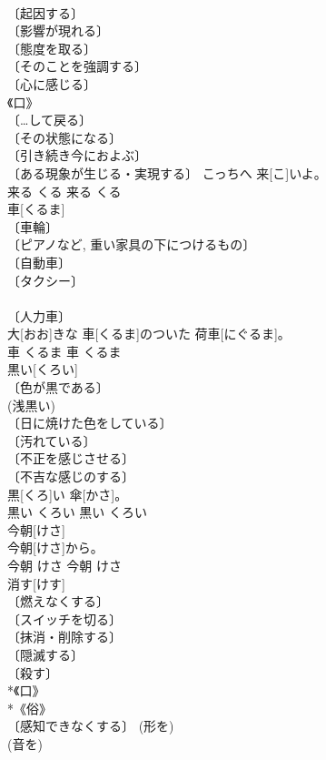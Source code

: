 \documentclass[8pt]{extreport}
\begin{document}
\begin{CJK}{UTF8}{min}
\\	〔起因する〕 
\\	〔影響が現れる〕 
\\	〔態度を取る〕 
\\	〔そのことを強調する〕 
\\	〔心に感じる〕 
\\	《口》 
\\	〔…して戻る〕 
\\	〔その状態になる〕 
\\	〔引き続き今におよぶ〕 
\\	〔ある現象が生じる・実現する〕	こっちへ 来[こ]いよ。	
\\	来る	くる	来る	くる	
\\	車[くるま]	
\\	〔車輪〕 
\\	〔ピアノなど, 重い家具の下につけるもの〕 
\\	〔自動車〕 
\\	〔タクシー〕 
\\	[⇒じどうしゃ] 
\\	〔人力車〕 
\\	大[おお]きな 車[くるま]のついた 荷車[にぐるま]。	
\\	車	くるま	車	くるま	
\\	黒い[くろい]	
\\	〔色が黒である〕 
\\	(浅黒い) 
\\	〔日に焼けた色をしている〕 
\\	〔汚れている〕 
\\	〔不正を感じさせる〕 
\\	〔不吉な感じのする〕 
\\	黒[くろ]い 傘[かさ]。	
\\	黒い	くろい	黒い	くろい	
\\	今朝[けさ]	
\\	今朝[けさ]から。	
\\	今朝	けさ	今朝	けさ	
\\	消す[けす]	
\\	〔燃えなくする〕 
\\	〔スイッチを切る〕 
\\	〔抹消・削除する〕 
\\	〔隠滅する〕 
\\	〔殺す〕 
\\	*《口》 
\\	*《俗》 
\\	〔感知できなくする〕 (形を) 
\\	(音を) 

\end{CJK}
\end{document}
